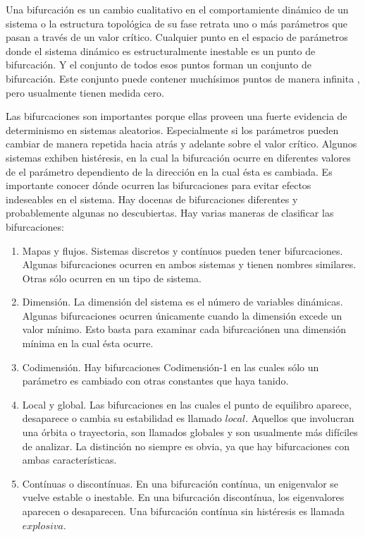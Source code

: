 \documentclass[prodmode,acmtap]{acmlarge}
\begin{document}
Una bifurcación es un cambio cualitativo en el comportamiente dinámico de un sistema o la estructura topológica de su fase retrata uno o más parámetros que pasan a través de un valor crítico. Cualquier punto en el espacio de parámetros donde el sistema dinámico es estructuralmente inestable es un punto de bifurcación. Y el conjunto de todos esos puntos forman un conjunto de bifurcación. Este conjunto puede contener muchísimos puntos de manera infinita , pero usualmente tienen medida cero.

Las bifurcaciones son importantes porque ellas proveen una fuerte evidencia de determinismo en sistemas aleatorios. Especialmente si los parámetros pueden cambiar de manera repetida hacia atrás y adelante  sobre el valor crítico. Algunos sistemas exhiben histéresis, en la cual la bifurcación ocurre en diferentes valores de el parámetro dependiento de la dirección en la cual ésta es cambiada. Es importante conocer dónde ocurren las bifurcaciones para evitar efectos indeseables en el sistema. Hay docenas de bifurcaciones diferentes y probablemente algunas no descubiertas. Hay varias maneras de clasificar las bifurcaciones:

\begin{enumerate}
\item Mapas y flujos. Sistemas discretos y contínuos pueden tener bifurcaciones. Algunas bifurcaciones ocurren en ambos sistemas y tienen nombres similares. Otras sólo ocurren en un tipo de sistema.
\item Dimensión. La dimensión del sistema es el número de variables dinámicas. Algunas bifurcaciones ocurren únicamente cuando la dimensión excede un valor mínimo. Esto basta para examinar cada bifurcaciónen una dimensión mínima en la cual ésta ocurre.
\item Codimensión. Hay bifurcaciones Codimensión-1 en las cuales sólo un parámetro es cambiado con otras constantes que haya tanido.
\item Local y global. Las bifurcaciones en las cuales el punto de equilibro aparece, desaparece o cambia su estabilidad es llamado $local$. Aquellos que involucran una órbita o trayectoria, son llamados globales y son usualmente más difíciles de analizar. La distinción no siempre es obvia, ya que hay bifurcaciones con ambas características. 
\item Contínuas o discontínuas. En una bifurcación contínua, un enigenvalor se vuelve estable o inestable. En una bifurcación discontínua, los eigenvalores aparecen o desaparecen. Una bifurcación contínua sin histéresis es llamada $explosiva$.
\end{enumerate}
\end{document}
